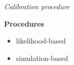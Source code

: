 \begin{frame}\begin{center}
		\LARGE\textit{Calibration procedure}
\end{center}\end{frame}
\begin{frame}
\textbf{Procedures}\vspace{0.5cm}
\begin{itemize}\setlength\itemsep{1em}
\item likelihood-based
\item simulation-based
\end{itemize}
\end{frame}
